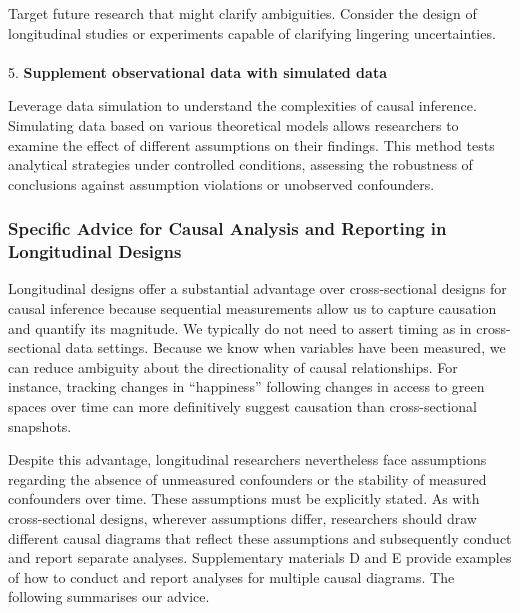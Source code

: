 \documentclass[
  singlecolumn]{article}
\makeatletter
\let\oldparagraph\paragraph
\renewcommand{\paragraph}{
    \@ifstar
      \xxxParagraphStar
      \xxxParagraphNoStar
  }
\newcommand{\xxxParagraphStar}[1]{\oldparagraph*{#1}\mbox{}}
\newcommand{\xxxParagraphNoStar}[1]{\oldparagraph{#1}\mbox{}}
\makeatother
\begin{document}
Target future research that might clarify ambiguities. Consider the
design of longitudinal studies or experiments capable of clarifying
lingering uncertainties.

\paragraph{\texorpdfstring{5. \textbf{Supplement observational data with
simulated
data}}{5. Supplement observational data with simulated data}}\label{supplement-observational-data-with-simulated-data}

Leverage data simulation to understand the complexities of causal
inference. Simulating data based on various theoretical models allows
researchers to examine the effect of different assumptions on their
findings. This method tests analytical strategies under controlled
conditions, assessing the robustness of conclusions against assumption
violations or unobserved confounders.

\subsubsection{Specific Advice for Causal Analysis and Reporting in
Longitudinal
Designs}\label{specific-advice-for-causal-analysis-and-reporting-in-longitudinal-designs}

Longitudinal designs offer a substantial advantage over cross-sectional
designs for causal inference because sequential measurements allow us to
capture causation and quantify its magnitude. We typically do not need
to assert timing as in cross-sectional data settings. Because we know
when variables have been measured, we can reduce ambiguity about the
directionality of causal relationships. For instance, tracking changes
in ``happiness'' following changes in access to green spaces over time
can more definitively suggest causation than cross-sectional snapshots.

Despite this advantage, longitudinal researchers nevertheless face
assumptions regarding the absence of unmeasured confounders or the
stability of measured confounders over time. These assumptions must be
explicitly stated. As with cross-sectional designs, wherever assumptions
differ, researchers should draw different causal diagrams that reflect
these assumptions and subsequently conduct and report separate analyses.
Supplementary materials D and E provide examples of how to conduct and
report analyses for multiple causal diagrams. The following summarises
our advice.
\end{document}
